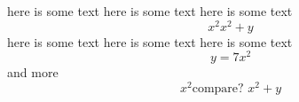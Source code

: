 here is some text here is some text here is some text
\[
	x^2 \text{$x^2+y$}
\]
here is some text here is some text here is some text \[ y=7x^2\] and more
\[
	x^2 \text{compare? $x^2+y$}
\]
